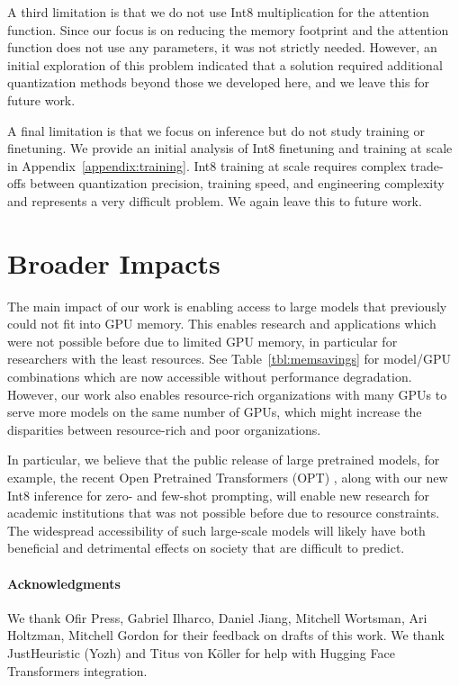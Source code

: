 A third limitation is that we do not use Int8 multiplication for the attention function. Since our focus is on reducing the memory footprint and the attention function does not use any parameters, it was not strictly needed. However, an initial exploration of this problem indicated that a solution required additional quantization methods beyond those we developed here, and we leave this for future work.

A final limitation is that we focus on inference but do not study training or finetuning. We provide an initial analysis of Int8 finetuning and training at scale in Appendix~\ref{appendix:training}. Int8 training at scale requires complex trade-offs between quantization precision, training speed, and engineering complexity and represents a very difficult problem. We again leave this to future work. 

\section{Broader Impacts}

The main impact of our work is enabling access to large models that previously could not fit into GPU memory. This enables research and applications which were not possible before due to limited GPU memory, in particular for researchers with the least resources. See Table~\ref{tbl:memsavings} for model/GPU combinations which are now accessible without performance degradation. However, our work also enables resource-rich organizations with many GPUs to serve more models on the same number of GPUs, which might increase the disparities between resource-rich and poor organizations.

In particular, we believe that the public release of large pretrained models, for example, the recent Open Pretrained Transformers (OPT) \citep{zhang2022opt}, along with our new Int8 inference for zero- and few-shot prompting, will enable new research for academic institutions that was not possible before due to resource constraints. The widespread accessibility of such large-scale models will likely have both beneficial and detrimental effects on society that are difficult to predict.

\paragraph{Acknowledgments}

We thank Ofir Press, Gabriel Ilharco, Daniel Jiang, Mitchell Wortsman, Ari Holtzman, Mitchell Gordon for their feedback on drafts of this work. We thank JustHeuristic (Yozh) and Titus von Köller for help with Hugging Face Transformers integration.



